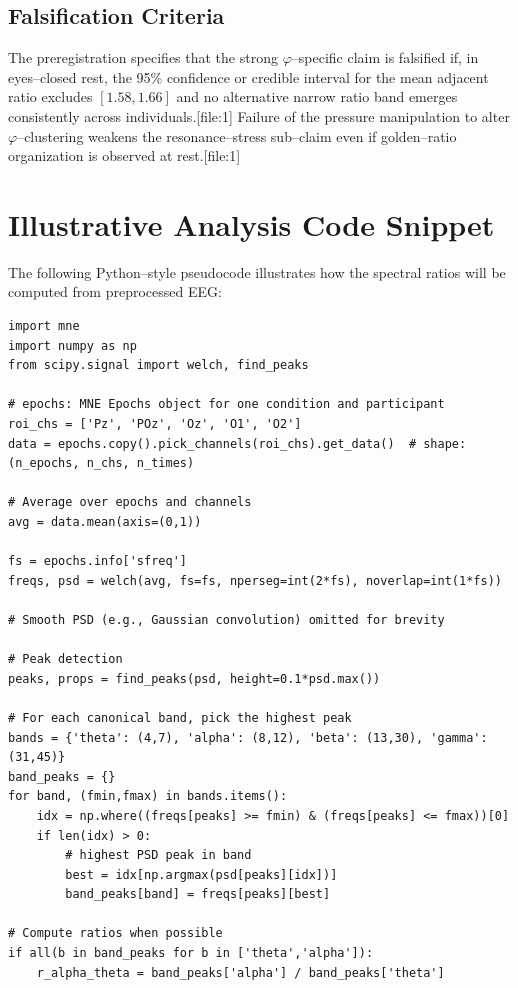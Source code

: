 \documentclass[11pt]{article}
\begin{document}
\subsection{Falsification Criteria}

The preregistration specifies that the strong $\varphi$--specific claim is falsified if, in eyes--closed rest, the 95\% confidence or credible interval for the mean adjacent ratio excludes $[1.58,1.66]$ and no alternative narrow ratio band emerges consistently across individuals.[file:1]
Failure of the pressure manipulation to alter $\varphi$--clustering weakens the resonance--stress sub--claim even if golden--ratio organization is observed at rest.[file:1]

\section{Illustrative Analysis Code Snippet}

The following Python--style pseudocode illustrates how the spectral ratios will be computed from preprocessed EEG:

\begin{verbatim}
import mne
import numpy as np
from scipy.signal import welch, find_peaks

# epochs: MNE Epochs object for one condition and participant
roi_chs = ['Pz', 'POz', 'Oz', 'O1', 'O2']
data = epochs.copy().pick_channels(roi_chs).get_data()  # shape: (n_epochs, n_chs, n_times)

# Average over epochs and channels
avg = data.mean(axis=(0,1))

fs = epochs.info['sfreq']
freqs, psd = welch(avg, fs=fs, nperseg=int(2*fs), noverlap=int(1*fs))

# Smooth PSD (e.g., Gaussian convolution) omitted for brevity

# Peak detection
peaks, props = find_peaks(psd, height=0.1*psd.max())

# For each canonical band, pick the highest peak
bands = {'theta': (4,7), 'alpha': (8,12), 'beta': (13,30), 'gamma': (31,45)}
band_peaks = {}
for band, (fmin,fmax) in bands.items():
    idx = np.where((freqs[peaks] >= fmin) & (freqs[peaks] <= fmax))[0]
    if len(idx) > 0:
        # highest PSD peak in band
        best = idx[np.argmax(psd[peaks][idx])]
        band_peaks[band] = freqs[peaks][best]

# Compute ratios when possible
if all(b in band_peaks for b in ['theta','alpha']):
    r_alpha_theta = band_peaks['alpha'] / band_peaks['theta']
\end{verbatim}
\end{document}
